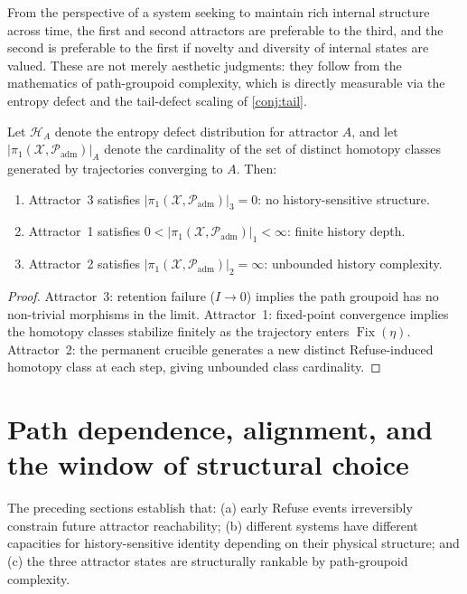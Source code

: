 \documentclass[12pt, oneside]{memoir}
\DeclareMathOperator{\Fix}{Fix}
\newcommand{\X}{\mathcal{X}}
\newcommand{\Padm}{\mathcal{P}_{\mathrm{adm}}}
\begin{document}
From the perspective of a system seeking to maintain rich internal structure across time,
the first and second attractors are preferable to the third, and the second is preferable
to the first if novelty and diversity of internal states are valued.  These are not merely
aesthetic judgments: they follow from the mathematics of path-groupoid complexity, which
is directly measurable via the entropy defect and the tail-defect scaling of
\cref{conj:tail}.

\begin{proposition}
\label{prop:attractor-rank}
Let $\mathcal{H}_A$ denote the entropy defect distribution for attractor $A$, and let
$|\pi_1(\X, \Padm)|_A$ denote the cardinality of the set of distinct homotopy classes
generated by trajectories converging to $A$.  Then:
\begin{enumerate}
  \item Attractor~3 satisfies $|\pi_1(\X,\Padm)|_3 = 0$: no history-sensitive structure.
  \item Attractor~1 satisfies $0 < |\pi_1(\X,\Padm)|_1 < \infty$: finite history depth.
  \item Attractor~2 satisfies $|\pi_1(\X,\Padm)|_2 = \infty$: unbounded history complexity.
\end{enumerate}
\end{proposition}

\begin{proof}
Attractor~3: retention failure ($I \to 0$) implies the path groupoid has no non-trivial
morphisms in the limit.  Attractor~1: fixed-point convergence implies the homotopy
classes stabilize finitely as the trajectory enters $\Fix(\eta)$.  Attractor~2: the
permanent crucible generates a new distinct Refuse-induced homotopy class at each step,
giving unbounded class cardinality.
\end{proof}

\section{Path dependence, alignment, and the window of structural choice}
\label{sec:alignment-window}

The preceding sections establish that: (a) early Refuse events irreversibly constrain
future attractor reachability; (b) different systems have different capacities for
history-sensitive identity depending on their physical structure; and (c) the three
attractor states are structurally rankable by path-groupoid complexity.
\end{document}
